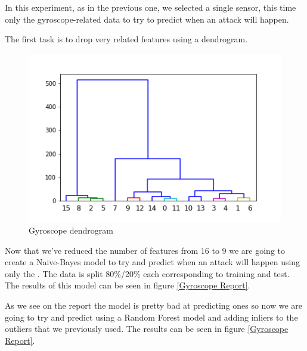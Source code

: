 \documentclass[idxtotoc,hyperref,openany]{labbook} %
\begin{document}

In this experiment, as in the previous one, we selected a single sensor, this time only the gyroscope-related data to try to predict when an attack will happen.

The first task is to drop very related features using a dendrogram.

\begin{figure}[h]
\includegraphics[width=0.9\linewidth]{Milestone3/Dendrogram_Gyroscope.png}
\setlength\belowcaptionskip{-10pt}
\caption{Gyroscope dendrogram}
\label{Milestone 3 Gyroscope Dendrogram}
\end{figure}

Now that we've reduced the number of features from 16 to 9 we are going to create a Naive-Bayes model to try and predict when an attack will happen using only the .
The data is split 80\%/20\% each corresponding to training and test. The results of this model can be seen in figure \ref{Gyroscope Report}.

As we see on the report the model is pretty bad at predicting ones so now we are going to try and predict using a Random Forest model and adding inliers to the outliers that we previously used.
The results can be seen in figure \ref{Gyroscope Report}.
\end{document}
